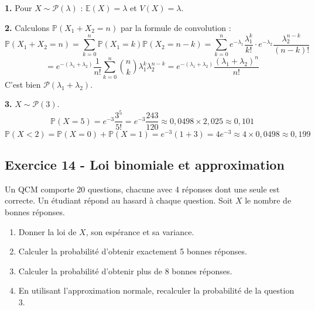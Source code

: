 \documentclass[12pt,a4paper]{article}
\begin{document}
\begin{boitecorrige}
\textbf{1.} Pour $X\sim\mathcal{P}(\lambda)$ : $\mathbb{E}(X) = \lambda$ et $V(X) = \lambda$.

\textbf{2.} Calculons $\mathbb{P}(X_1+X_2=n)$ par la formule de convolution :
\[
\mathbb{P}(X_1+X_2=n) = \sum_{k=0}^n \mathbb{P}(X_1=k)\mathbb{P}(X_2=n-k) = \sum_{k=0}^n e^{-\lambda_1}\frac{\lambda_1^k}{k!}\cdot e^{-\lambda_2}\frac{\lambda_2^{n-k}}{(n-k)!}
\]
\[
= e^{-(\lambda_1+\lambda_2)}\frac{1}{n!}\sum_{k=0}^n\binom{n}{k}\lambda_1^k\lambda_2^{n-k} = e^{-(\lambda_1+\lambda_2)}\frac{(\lambda_1+\lambda_2)^n}{n!}
\]
C'est bien $\mathcal{P}(\lambda_1+\lambda_2)$.

\textbf{3.} $X\sim\mathcal{P}(3)$.
\[
\mathbb{P}(X=5) = e^{-3}\frac{3^5}{5!} = e^{-3}\frac{243}{120} \approx 0{,}0498\times2{,}025 \approx \boxed{0{,}101}
\]
\[
\mathbb{P}(X<2) = \mathbb{P}(X=0)+\mathbb{P}(X=1) = e^{-3}(1+3) = 4e^{-3} \approx 4\times0{,}0498 \approx \boxed{0{,}199}
\]
\end{boitecorrige}

\subsection*{Exercice 14 - Loi binomiale et approximation \niveau{\moyen}}

\begin{boiteexercice}
Un QCM comporte 20 questions, chacune avec 4 réponses dont une seule est correcte. Un étudiant répond au hasard à chaque question. Soit $X$ le nombre de bonnes réponses.
\begin{enumerate}
  \item Donner la loi de $X$, son espérance et sa variance.
  \item Calculer la probabilité d'obtenir exactement 5 bonnes réponses.
  \item Calculer la probabilité d'obtenir plus de 8 bonnes réponses.
  \item En utilisant l'approximation normale, recalculer la probabilité de la question 3.
\end{enumerate}
\end{boiteexercice}
\end{document}
